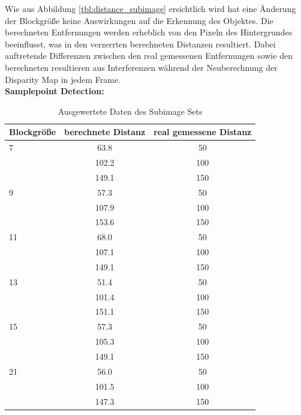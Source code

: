 \noindent
Wie aus Abbildung \ref{tbl:distance_subimage} ersichtlich wird hat eine Änderung der Blockgröße keine Auswirkungen auf die Erkennung des Objektes. Die berechneten Entfernungen werden erheblich von den Pixeln des Hintergrundes beeinflusst, was in den verzerrten berechneten Distanzen resultiert. Dabei auftretende Differenzen zwischen den real gemessenen Entfernungen sowie den berechneten resultieren aus Interferenzen während der Neuberechnung der Disparity Map in jedem Frame.\\

\noindent
\textbf{Samplepoint Detection:}\\

\begin{table}[h]
\centering
\begin{tabular}{|l||c|c|}
\hline
Blockgröße & berechnete Distanz & real gemessene Distanz \\
\hline\hline
7          & 63.8               & 50                     \\
           & 102.2              & 100                    \\
           & 149.1              & 150                    \\
\hline
9          & 57.3               & 50                     \\
           & 107.9              & 100                    \\
           & 153.6              & 150                    \\
\hline
11         & 68.0               & 50                     \\
           & 107.1              & 100                    \\
           & 149.1              & 150                    \\
\hline
13         & 51.4               & 50                     \\
           & 101.4              & 100                    \\
           & 151.1              & 150                    \\
\hline
15         & 57.3               & 50                     \\
           & 105.3              & 100                    \\
           & 149.1              & 150                    \\
\hline
21         & 56.0               & 50                     \\
           & 101.5              & 100                    \\
           & 147.3              & 150                    \\
\hline
\end{tabular}
\caption{Ausgewertete Daten des Subimage Sets }
\label{tbl:distance_samplepoint}
\end{table}

